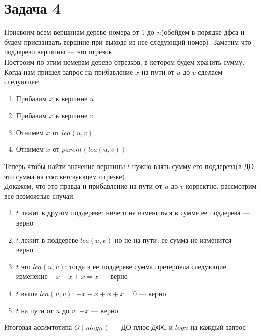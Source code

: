 \documentclass{article}
\begin{document}
\section{Задача 4}
Присвоим всем вершинам дереве номера от $1$ до $n$(обойдем в порядке дфса и будем присваивать вершине при выходе из нее следующий номер). Заметим что поддерево вершины --- это отрезок.\\
Построим по этим номерам дерево отрезков, в котором будем хранить сумму. Когда нам пришел запрос на прибавление $x$ на пути от $u$ до $v$ сделаем следующее:
\begin{enumerate}
\item 
Прибавим $x$ к вершине $u$
\item 
Прибавим $x$ к вершине $v$
\item
Отнимем $x$ от $lca(u,v)$
\item
Отнимем $x$ от $parent(lca(u, v))$
\end{enumerate}
Теперь чтобы найти значение вершины $t$ нужно взять сумму его поддерева(в ДО это сумма на соответсвующем отрезке).\\
Докажем, что это правда и прибавление на пути от $u$ до $v$ корректно, рассмотрим все возможные случаи:
\begin{enumerate}
\item 
$t$ лежит в другом поддереве: ничего не измениться в сумме ее поддерева --- верно
\item
$t$ лежит в поддереве $lca(u,v)$ но не на пути: ее сумма не изменится --- верно
\item 
$t$ это $lca(u,v)$: тогда в ее поддереве сумма претерпела следующие изменение $-x+x+x=x$ --- верно
\item
$t$ выше $lca(u,v)$: $-x-x+x+x=0$ --- верно
\item
$t$ на пути от $u$ до $v$: $+x$ --- верно
\end{enumerate}
Итоговая ассимтотипа $O(nlogn)$ --- ДО плюс ДФС и $logn$ на каждый запрос
\end{document}
